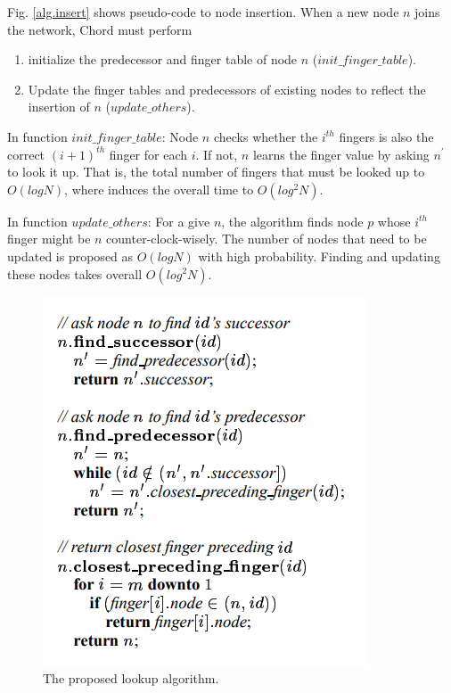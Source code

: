 \documentclass{article}
\begin{document}
Fig. \ref{alg.insert} shows pseudo-code to node insertion. When a new node $n$ joins the network, Chord must perform
\begin{enumerate}
\item initialize the predecessor and finger table of node $n$ ($init\_finger\_table$).
\item Update the finger tables and predecessors of existing nodes to reflect the insertion of $n$ ($update\_others$).
\end{enumerate}
In function $init\_finger\_table$: Node $n$ checks whether the $i^{th}$ fingers is also the correct $(i+1)^{th}$ finger for each $i$. If not, $n$ learns the finger value by asking $n^\prime$ to look it up. That is, the total number of fingers that must be looked up to $O(logN)$, where induces the overall time to $O(log^2N)$.

In function $update\_others$: For a give $n$, the algorithm finds node $p$ whose $i^{th}$ finger might be $n$ counter-clock-wisely. The number of nodes that need to be updated is proposed as $O(logN)$ with high probability. Finding and updating these nodes takes overall $O(log^2N)$.

\begin{figure}[H]
\centering
\includegraphics[scale=1.5]{alg_lookup.PNG}
\caption{The proposed lookup algorithm.
\label{alg.lookup}}
\end{figure}
\end{document}
